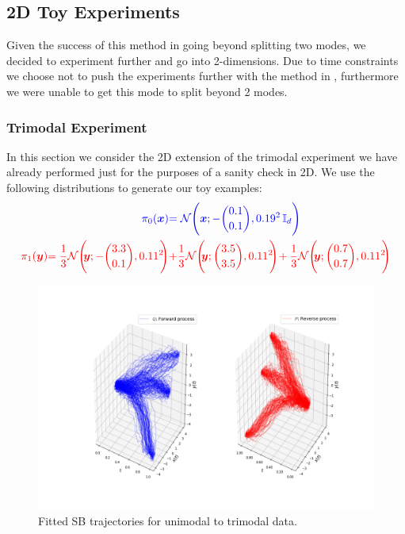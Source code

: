 \documentclass[a4paper,12pt,twoside,openright]{report}
\theoremstyle{definition}
\begin{document}
\subsection{2D Toy Experiments}

Given the success of this method in going beyond splitting two modes, we decided to experiment further and go into 2-dimensions. Due to time constraints we choose not to push the experiments further with the method in \cite{pavon2018data}, furthermore we were unable to get this mode to split beyond 2 modes. 

\subsubsection{Trimodal Experiment}
In this section we consider the 2D extension of the trimodal experiment we have already performed just for the purposes of a sanity check in 2D.   We use the following distributions to generate our toy examples:
\begin{align*}
    \color{blue}{\pi_0(\vx)} &\color{blue}{= \calN\Bigg(\vx; -{0.1\choose0.1},  0.19^2\, \I \Bigg)} \\
    \color{red}{\pi_1(\vy)} \color{red}{= \frac{1}{3}\calN\Bigg(\!\!\vy; -{3.3\choose0.1}, 0.11^2\!\!\Bigg)}&\color{red}{ + \frac{1}{3}\calN\Bigg(\!\!\vy; {3.5\choose3.5}, 0.11 ^2\!\!\Bigg)}\!+\color{red}{ \frac{1}{3}\calN\Bigg(\!\!\vy; {0.7\choose0.7}, 0.11 ^2\!\!\Bigg)}
\end{align*}
\begin{figure}
    \centering
    \includegraphics[scale=0.4,trim={5.3cm 1cm 2.5cm 0}, clip]{images/GP/2d_3mode_GP_means_3.3_3.6_0.7_std_0.1_200.png}
    \caption{ Fitted SB trajectories for unimodal to trimodal data.  }
    \label{fig:3mode2d200trajectroies2d}
\end{figure}
\end{document}
